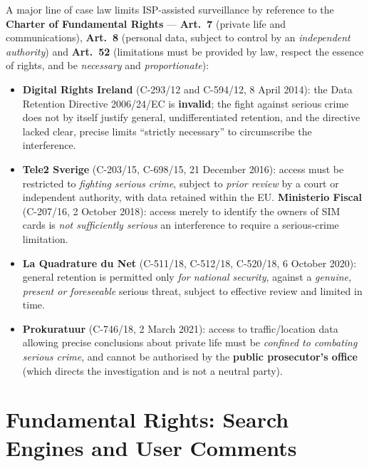 \documentclass[11pt,a4paper,openany]{report}
\theoremstyle{definition}
\theoremstyle{plain}
\theoremstyle{remark}
\begin{document}
A major line of case law limits ISP-assisted surveillance by reference to the \textbf{Charter of Fundamental Rights} --- \textbf{Art.\ 7} (private life and communications), \textbf{Art.\ 8} (personal data, subject to control by an \emph{independent authority}) and \textbf{Art.\ 52} (limitations must be provided by law, respect the essence of rights, and be \emph{necessary} and \emph{proportionate}):
\begin{itemize}
    \item \textbf{Digital Rights Ireland} (C-293/12 and C-594/12, 8 April 2014): the Data Retention Directive 2006/24/EC is \textbf{invalid}; the fight against serious crime does not by itself justify general, undifferentiated retention, and the directive lacked clear, precise limits ``strictly necessary'' to circumscribe the interference.
    \item \textbf{Tele2 Sverige} (C-203/15, C-698/15, 21 December 2016): access must be restricted to \emph{fighting serious crime}, subject to \emph{prior review} by a court or independent authority, with data retained within the EU. \textbf{Ministerio Fiscal} (C-207/16, 2 October 2018): access merely to identify the owners of SIM cards is \emph{not sufficiently serious} an interference to require a serious-crime limitation.
    \item \textbf{La Quadrature du Net} (C-511/18, C-512/18, C-520/18, 6 October 2020): general retention is permitted only \emph{for national security}, against a \emph{genuine, present or foreseeable} serious threat, subject to effective review and limited in time.
    \item \textbf{Prokuratuur} (C-746/18, 2 March 2021): access to traffic/location data allowing precise conclusions about private life must be \emph{confined to combating serious crime}, and cannot be authorised by the \textbf{public prosecutor's office} (which directs the investigation and is not a neutral party).
\end{itemize}

\section{Fundamental Rights: Search Engines and User Comments}
\end{document}
